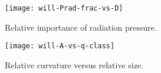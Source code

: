 \documentclass{emulateapj}
\begin{document}
\begin{figure}
  \centering
  \texttt{[image: will-Prad-frac-vs-D]}
  \caption{Relative importance of radiation pressure.}
  \label{fig:flaring}
\end{figure}

\begin{figure}
  \centering
  \texttt{[image: will-A-vs-q-class]}
  \caption{Relative curvature versus relative size.}
  \label{fig:flaring}
\end{figure}
\end{document}
